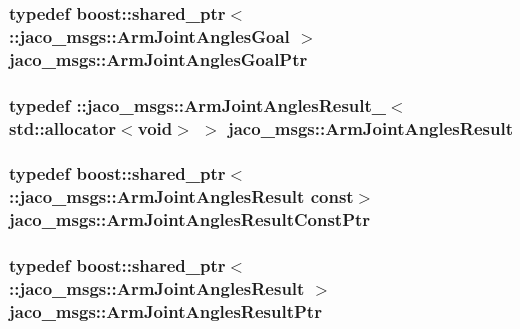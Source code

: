 \subsubsection[{\texorpdfstring{Arm\+Joint\+Angles\+Goal\+Ptr}{ArmJointAnglesGoalPtr}}]{\setlength{\rightskip}{0pt plus 5cm}typedef boost\+::shared\+\_\+ptr$<$ \+::{\bf jaco\+\_\+msgs\+::\+Arm\+Joint\+Angles\+Goal} $>$ {\bf jaco\+\_\+msgs\+::\+Arm\+Joint\+Angles\+Goal\+Ptr}}\hypertarget{namespacejaco__msgs_a2bf27c120c452214bdb882f04e4197cf}{}\label{namespacejaco__msgs_a2bf27c120c452214bdb882f04e4197cf}
\subsubsection[{\texorpdfstring{Arm\+Joint\+Angles\+Result}{ArmJointAnglesResult}}]{\setlength{\rightskip}{0pt plus 5cm}typedef \+::{\bf jaco\+\_\+msgs\+::\+Arm\+Joint\+Angles\+Result\+\_\+}$<$std\+::allocator$<$void$>$ $>$ {\bf jaco\+\_\+msgs\+::\+Arm\+Joint\+Angles\+Result}}\hypertarget{namespacejaco__msgs_a162d07c0197060599e2b1173b15c683d}{}\label{namespacejaco__msgs_a162d07c0197060599e2b1173b15c683d}
\subsubsection[{\texorpdfstring{Arm\+Joint\+Angles\+Result\+Const\+Ptr}{ArmJointAnglesResultConstPtr}}]{\setlength{\rightskip}{0pt plus 5cm}typedef boost\+::shared\+\_\+ptr$<$ \+::{\bf jaco\+\_\+msgs\+::\+Arm\+Joint\+Angles\+Result} const$>$ {\bf jaco\+\_\+msgs\+::\+Arm\+Joint\+Angles\+Result\+Const\+Ptr}}\hypertarget{namespacejaco__msgs_a6b7a7c048f53348e4241da395f67c057}{}\label{namespacejaco__msgs_a6b7a7c048f53348e4241da395f67c057}
\subsubsection[{\texorpdfstring{Arm\+Joint\+Angles\+Result\+Ptr}{ArmJointAnglesResultPtr}}]{\setlength{\rightskip}{0pt plus 5cm}typedef boost\+::shared\+\_\+ptr$<$ \+::{\bf jaco\+\_\+msgs\+::\+Arm\+Joint\+Angles\+Result} $>$ {\bf jaco\+\_\+msgs\+::\+Arm\+Joint\+Angles\+Result\+Ptr}}\hypertarget{namespacejaco__msgs_a6de532983ecb41c3ff4b7f2b16c5727d}{}\label{namespacejaco__msgs_a6de532983ecb41c3ff4b7f2b16c5727d}
